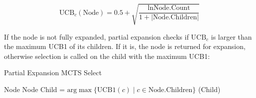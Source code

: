\begin{equation}
    \label{eq:upper_confidence_child}
    \text{UCB}_c(\text{Node}) = 0.5 + \sqrt{\frac{\ln\text{Node.Count}}{1 + |\text{Node.Children}|}}
\end{equation}            

If the node is not fully expanded, partial expansion checks if
$\text{UCB}_c$ is larger than the maximum UCB1 of its children.
If it is, the node is returned for expansion, otherwise selection 
is called on the child with the maximum UCB1:
\begin{algorithm}
    \caption{Partial Expansion MCTS Select}
    \begin{algorithmic}[1]
                \State \Return Node
            \EndIf
            \State \Return Node
            \Else
            \State Child = 
            $\text{arg}\max \{ \text{UCB1}(c) \;|\; c \in \text{Node.Children} \}$ 
            \State \Return {}(Child)

            \EndIf
        \EndProcedure
    \end{algorithmic}        
\end{algorithm}
